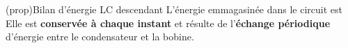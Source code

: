 \documentclass[../../main/main.tex]{subfiles}
\begin{document}
\begin{tcb*}[label=prop:lcenerg-décharge, sidebyside, righthand ratio=.3]
	(prop){Bilan d'énergie LC descendant}
	L'énergie emmagasinée dans le circuit est
	\psw{%
	\[
		\boxed{\Ec = \frac{1}{2}Cu_C{}^2 + \frac{1}{2}Li^2}
	\]
	}%
	Elle est \textbf{conservée à chaque instant} et résulte de l'\textbf{échange
		périodique} d'énergie entre le condensateur et la bobine.
	\tcblower
	\begin{center}
	\end{center}
\end{tcb*}
\end{document}
